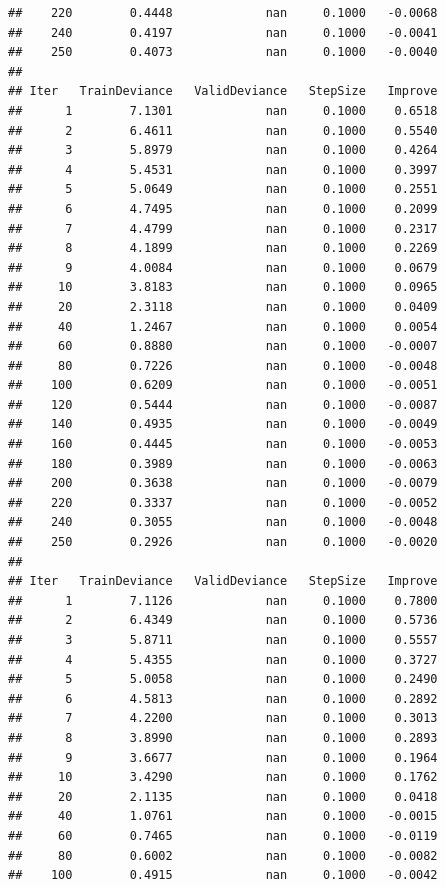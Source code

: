 \documentclass[]{book}
\begin{document}
\begin{verbatim}
##    220        0.4448             nan     0.1000   -0.0068
##    240        0.4197             nan     0.1000   -0.0041
##    250        0.4073             nan     0.1000   -0.0040
## 
## Iter   TrainDeviance   ValidDeviance   StepSize   Improve
##      1        7.1301             nan     0.1000    0.6518
##      2        6.4611             nan     0.1000    0.5540
##      3        5.8979             nan     0.1000    0.4264
##      4        5.4531             nan     0.1000    0.3997
##      5        5.0649             nan     0.1000    0.2551
##      6        4.7495             nan     0.1000    0.2099
##      7        4.4799             nan     0.1000    0.2317
##      8        4.1899             nan     0.1000    0.2269
##      9        4.0084             nan     0.1000    0.0679
##     10        3.8183             nan     0.1000    0.0965
##     20        2.3118             nan     0.1000    0.0409
##     40        1.2467             nan     0.1000    0.0054
##     60        0.8880             nan     0.1000   -0.0007
##     80        0.7226             nan     0.1000   -0.0048
##    100        0.6209             nan     0.1000   -0.0051
##    120        0.5444             nan     0.1000   -0.0087
##    140        0.4935             nan     0.1000   -0.0049
##    160        0.4445             nan     0.1000   -0.0053
##    180        0.3989             nan     0.1000   -0.0063
##    200        0.3638             nan     0.1000   -0.0079
##    220        0.3337             nan     0.1000   -0.0052
##    240        0.3055             nan     0.1000   -0.0048
##    250        0.2926             nan     0.1000   -0.0020
## 
## Iter   TrainDeviance   ValidDeviance   StepSize   Improve
##      1        7.1126             nan     0.1000    0.7800
##      2        6.4349             nan     0.1000    0.5736
##      3        5.8711             nan     0.1000    0.5557
##      4        5.4355             nan     0.1000    0.3727
##      5        5.0058             nan     0.1000    0.2490
##      6        4.5813             nan     0.1000    0.2892
##      7        4.2200             nan     0.1000    0.3013
##      8        3.8990             nan     0.1000    0.2893
##      9        3.6677             nan     0.1000    0.1964
##     10        3.4290             nan     0.1000    0.1762
##     20        2.1135             nan     0.1000    0.0418
##     40        1.0761             nan     0.1000   -0.0015
##     60        0.7465             nan     0.1000   -0.0119
##     80        0.6002             nan     0.1000   -0.0082
##    100        0.4915             nan     0.1000   -0.0042

\end{verbatim}
\end{document}
